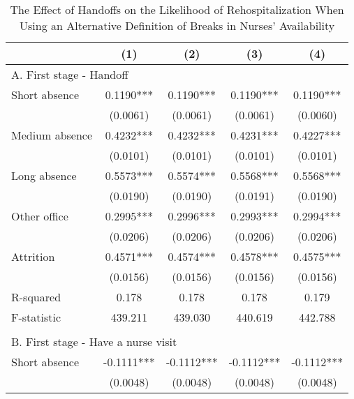 \documentclass[final,12pt, notitlepage]{article}
\begin{document}
\begin{singlespace}
\begin{table}[H]
\footnotesize
\setlength\tabcolsep{0pt}
\centering
\caption{The Effect of Handoffs on the Likelihood of Rehospitalization When Using an Alternative Definition of Breaks in Nurses' Availability}
\label{tab:iv_robust}
\begin{threeparttable}
{
\def\sym#1{\ifmmode^{#1}\else\(^{#1}\)\fi}
\begin{tabular*}{\textwidth}{l@{\extracolsep{\fill}}*{4}{c}} %
\toprule
                    &\multicolumn{1}{c}{(1)}&\multicolumn{1}{c}{(2)}&\multicolumn{1}{c}{(3)}&\multicolumn{1}{c}{(4)}\\
\midrule
\multicolumn{5}{l}{A. First stage - Handoff} \\
Short absence       &      0.1190***&      0.1190***&      0.1190***&      0.1190***\\
                    &    (0.0061)   &    (0.0061)   &    (0.0061)   &    (0.0060)   \\
Medium absence      &      0.4232***&      0.4232***&      0.4231***&      0.4227***\\
                    &    (0.0101)   &    (0.0101)   &    (0.0101)   &    (0.0101)   \\
Long absence        &      0.5573***&      0.5574***&      0.5568***&      0.5568***\\
                    &    (0.0190)   &    (0.0190)   &    (0.0191)   &    (0.0190)   \\
Other office        &      0.2995***&      0.2996***&      0.2993***&      0.2994***\\
                    &    (0.0206)   &    (0.0206)   &    (0.0206)   &    (0.0206)   \\
Attrition           &      0.4571***&      0.4574***&      0.4578***&      0.4575***\\
                    &    (0.0156)   &    (0.0156)   &    (0.0156)   &    (0.0156)   \\
R-squared           &       0.178   &       0.178   &       0.178   &       0.179   \\
F-statistic         &     439.211   &     439.030   &     440.619   &     442.788   \\
\\
\multicolumn{5}{l}{B. First stage - Have a nurse visit} \\
Short absence       &     -0.1111***&     -0.1112***&     -0.1112***&     -0.1112***\\
                    &    (0.0048)   &    (0.0048)   &    (0.0048)   &    (0.0048)   \\

\end{tabular*}}
\end{threeparttable}
\end{table}
\end{singlespace}
\end{document}
